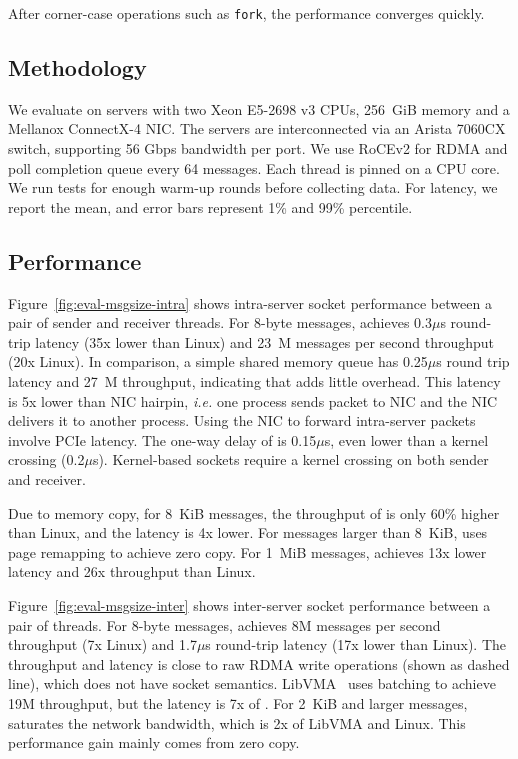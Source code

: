 After corner-case operations such as \texttt{fork}, the performance converges quickly.




\subsection{Methodology}

We evaluate \sys on servers with two Xeon E5-2698 v3 CPUs, 256~GiB memory and a Mellanox ConnectX-4 NIC. The servers are interconnected via an Arista 7060CX switch, supporting 56 Gbps bandwidth per port. We use RoCEv2 for RDMA and poll completion queue every 64 messages.
Each thread is pinned on a CPU core. We run tests for enough warm-up rounds before collecting data. For latency, we report the mean, and error bars represent 1\% and 99\% percentile.

\subsection{Performance}



Figure~\ref{fig:eval-msgsize-intra} shows intra-server socket performance between a pair of sender and receiver threads.
For 8-byte messages, \sys achieves 0.3$\mu$s round-trip latency (35x lower than Linux) and 23~M messages per second throughput (20x Linux).
In comparison, a simple shared memory queue has 0.25$\mu$s round trip latency and 27~M throughput, indicating that \sys adds little overhead.
This latency is 5x lower than NIC hairpin, \textit{i.e.} one process sends packet to NIC and the NIC delivers it to another process. Using the NIC to forward intra-server packets involve PCIe latency.
The one-way delay of \sys is 0.15$\mu$s, even lower than a kernel crossing (0.2$\mu$s). Kernel-based sockets require a kernel crossing on both sender and receiver.

Due to memory copy, for 8~KiB messages, the throughput of \sys is only 60\% higher than Linux, and the latency is 4x lower. For messages larger than 8~KiB, \sys uses page remapping to achieve zero copy. For 1~MiB messages, \sys achieves 13x lower latency and 26x throughput than Linux.


Figure~\ref{fig:eval-msgsize-inter} shows inter-server socket performance between a pair of threads.
For 8-byte messages, \sys achieves 8M messages per second throughput (7x Linux) and 1.7$\mu$s round-trip latency (17x lower than Linux).
The throughput and latency is close to raw RDMA write operations (shown as dashed line), which does not have socket semantics.
LibVMA~\cite{libvma} uses batching to achieve 19M throughput, but the latency is 7x of \sys.
For 2~KiB and larger messages, \sys saturates the network bandwidth, which is 2x of LibVMA and Linux. This performance gain mainly comes from zero copy.



